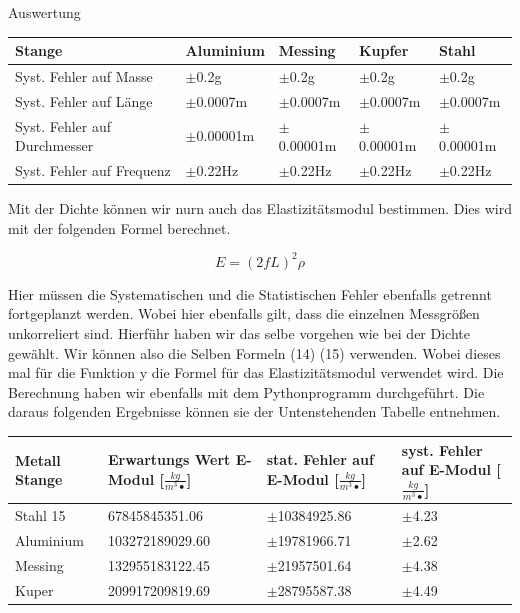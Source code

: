 \documentclass[twoside]{protokoll}
\begin{document}
\begin{aufgabe}{Auswertung}
 \begin{table}[H]
        \centering
        \begin{tabularx}{1\textwidth}{l X X X X} %
            \toprule
            \textbf{Stange} & Aluminium & Messing & Kupfer & Stahl \\
            \midrule
            Syst. Fehler auf Masse & $\pm$0.2g & $\pm$0.2g & $\pm$0.2g & $\pm$0.2g \\
            Syst. Fehler auf Länge & $\pm$0.0007m & $\pm$0.0007m & $\pm$0.0007m & $\pm$0.0007m \\
            Syst. Fehler auf Durchmesser & $\pm$0.00001m & $\pm$0.00001m & $\pm$0.00001m & $\pm$0.00001m \\
            Syst. Fehler auf Frequenz & $\pm$0.22Hz & $\pm$0.22Hz & $\pm$0.22Hz & $\pm$0.22Hz\\
            \midrule
            
            \bottomrule
        \end{tabularx}
        \label{tab:mytable}
    \end{table}


Mit der Dichte können wir nurn auch das Elastizitätsmodul bestimmen. Dies wird mit der folgenden Formel berechnet. 

    \begin{equation}
         E = (2fL)^2 \rho
    \end{equation}
    
Hier müssen die Systematischen und die Statistischen Fehler ebenfalls getrennt fortgeplanzt werden. Wobei hier ebenfalls gilt, dass die einzelnen Messgrößen 
unkorreliert sind. Hierführ haben wir das selbe vorgehen wie bei der Dichte gewählt.
Wir können also die Selben Formeln (14) (15) verwenden. 
Wobei dieses mal für die Funktion y die Formel für das Elastizitätsmodul verwendet wird. Die Berechnung haben wir ebenfalls mit dem Pythonprogramm durchgeführt. 
Die daraus folgenden Ergebnisse können sie der Untenstehenden Tabelle entnehmen. 

 \begin{table}[H]
        \centering
        \begin{tabularx}{1\textwidth}{X X X X} %
            \toprule
            \textbf{Metall Stange} & \textbf{Erwartungs Wert E-Modul [$\frac{kg}{m^3•}$]} & \textbf{stat. Fehler auf E-Modul [$\frac{kg}{m^3•}$]} & \textbf{syst. Fehler auf E-Modul [$\frac{kg}{m^3•}$]}\\
            \midrule
            Stahl 15 & 67845845351.06 & $\pm$10384925.86 & $\pm$4.23 \\
            Aluminium & 103272189029.60 & $\pm$19781966.71 & $\pm$2.62 \\
            Messing & 132955183122.45 & $\pm$21957501.64 & $\pm$4.38 \\
            Kuper & 209917209819.69 & $\pm$28795587.38 & $\pm$4.49\\
            \bottomrule
        \end{tabularx}
        \label{tab:mytable}
    \end{table}


\end{aufgabe}
\end{document}
